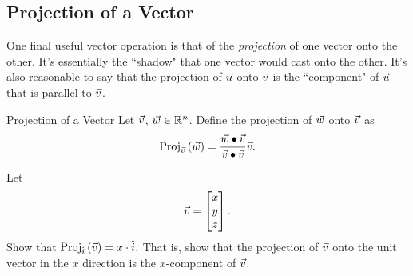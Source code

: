 \subsection{Projection of a Vector}

One final useful vector operation is that of the \textit{projection} of one vector onto the other. It's essentially the ``shadow" that one vector would cast onto the other. It's also reasonable to say that the projection of $\vec{u}$ onto $\vec{v}$ is the ``component" of $\vec{u}$ that is parallel to $\vec{v}$.

\begin{definition}{Projection of a Vector}
Let $\vec{v}$, $\vec{w}\in\mathbb{R}^n$. Define the projection of $\vec{w}$ onto $\vec{v}$ as
$$\mathrm{Proj}_{\vec{v}}\left({\vec{w}}\right)=\frac{\vec{w}\bullet\vec{v}}{\vec{v}\bullet\vec{v}}\vec{v}. $$
\begin{center}
\end{center}
\vspace{1em}
\end{definition}

\begin{exercise}{}
Let $$\vec{v}=\begin{bmatrix}x\\y\\z\end{bmatrix}.$$ Show that $\mathrm{Proj}_{\hat{i}}\left({\vec{v}}\right)=x\cdot \hat{i}.$ That is, show that the projection of $\vec{v}$ onto the unit vector in the $x$ direction is the $x$-component of $\vec{v}$.
\end{exercise}

